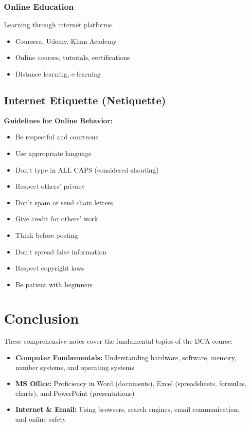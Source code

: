 \documentclass[12pt,a4paper]{article}
\begin{document}
\subsubsection{Online Education}
Learning through internet platforms.
\begin{itemize}
    \item Coursera, Udemy, Khan Academy
    \item Online courses, tutorials, certifications
    \item Distance learning, e-learning
\end{itemize}

\subsection{Internet Etiquette (Netiquette)}

\textbf{Guidelines for Online Behavior:}
\begin{itemize}
    \item Be respectful and courteous
    \item Use appropriate language
    \item Don't type in ALL CAPS (considered shouting)
    \item Respect others' privacy
    \item Don't spam or send chain letters
    \item Give credit for others' work
    \item Think before posting
    \item Don't spread false information
    \item Respect copyright laws
    \item Be patient with beginners
\end{itemize}

\newpage


\section{Conclusion}

These comprehensive notes cover the fundamental topics of the DCA course:

\begin{itemize}
    \item \textbf{Computer Fundamentals:} Understanding hardware, software, memory, number systems, and operating systems
    \item \textbf{MS Office:} Proficiency in Word (documents), Excel (spreadsheets, formulas, charts), and PowerPoint (presentations)
    \item \textbf{Internet \& Email:} Using browsers, search engines, email communication, and online safety
\end{itemize}
\end{document}
